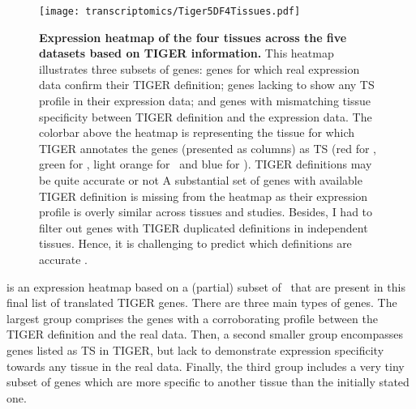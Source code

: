\begin{figure}[!ht]
    \texttt{[image: transcriptomics/Tiger5DF4Tissues.pdf]}\centering
    \caption[Expression heatmap of the four tissues across the five datasets based on
    TiGER]{\label{fig:TigerGenes}\textbf{Expression heatmap of the four tissues
    across the five datasets based on \gls{TIGER} information.}
    This heatmap illustrates three subsets of genes:
    genes for which real expression data confirm their \gls{TIGER} definition;
    genes lacking to show any \gls{TS} profile in their expression data; and
    genes with mismatching tissue specificity between \gls{TIGER}
    definition and the expression data.
    The colorbar above the heatmap is representing the tissue
    for which \gls{TIGER} annotates the genes (presented as columns) as \gls{TS}
    (red for \Heart, green for \kidney, light orange for \liver\ and blue for \testis).
    \gls{TIGER} definitions may be quite accurate or not
    A substantial set of genes with available \gls{TIGER} definition is missing
    from the heatmap as their expression profile is overly similar across
    tissues and studies.
    Besides, I had to filter out genes with \gls{TIGER} duplicated definitions
    in independent tissues.
    Hence, it is challenging
    to predict which definitions are accurate .
    }
\end{figure}

 is an expression heatmap based on
a (partial) subset of \pcgs\
that are present in this final list of translated \gls{TIGER} genes.
There are three main types of genes.
The largest group comprises the genes with a corroborating profile
between the \gls{TIGER} definition and the real data.
Then, a second smaller group encompasses genes
listed as \gls{TS} in \gls{TIGER},
but lack to demonstrate expression specificity
towards any tissue in the real data.
Finally, the third group includes a very tiny subset of genes which
are more specific to another tissue than the initially stated one.

